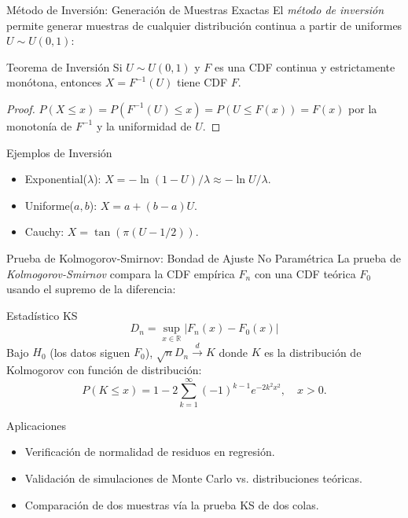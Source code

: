 \documentclass[10pt, aspectratio=169]{beamer}
\begin{document}
\begin{frame}{Método de Inversión: Generación de Muestras Exactas}
  \footnotesize
  El \emph{método de inversión} permite generar muestras de cualquier distribución continua a partir de uniformes $U \sim U(0, 1)$: \pause

  \vspace{0.1cm}
  \begin{block}{Teorema de Inversión}
    Si $U \sim U(0, 1)$ y $F$ es una CDF continua y estrictamente monótona, entonces $X = F^{-1}(U)$ tiene CDF $F$.
    \begin{proof}
      $P(X \le x) = P(F^{-1}(U) \le x) = P(U \le F(x)) = F(x)$ por la monotonía de $F^{-1}$ y la uniformidad de $U$.
    \end{proof}
  \end{block}

  \vspace{0.1cm}
  \pause
  \begin{alertblock}{Ejemplos de Inversión}
    \begin{itemize}\itemsep=0.05cm
      \item Exponential($\lambda$): $X = -\ln(1-U)/\lambda \approx -\ln U/\lambda$.
      \item Uniforme($a, b$): $X = a + (b-a)U$.
      \item Cauchy: $X = \tan(\pi(U - 1/2))$.
    \end{itemize}
  \end{alertblock}
\end{frame}

\begin{frame}{Prueba de Kolmogorov-Smirnov: Bondad de Ajuste No Paramétrica}
  \footnotesize
  La prueba de \emph{Kolmogorov-Smirnov} compara la CDF empírica $F_{n}$ con una CDF teórica $F_{0}$ usando el supremo de la diferencia: \pause

  \vspace{0.1cm}
  \begin{block}{Estadístico KS}
    $$D_{n} = \sup_{x \in \mathbb{R}} |F_{n}(x) - F_{0}(x)|$$
    Bajo $H_{0}$ (los datos siguen $F_{0}$), $\sqrt{n} D_{n} \xrightarrow{d} K$ donde $K$ es la distribución de Kolmogorov con función de distribución:
    $$P(K \le x) = 1 - 2\sum_{k=1}^{\infty}(-1)^{k-1}e^{-2k^{2}x^{2}}, \quad x > 0.$$
  \end{block}

  \vspace{0.1cm}
  \pause
  \begin{alertblock}{Aplicaciones}
    \begin{itemize}\itemsep=0.05cm
      \item Verificación de normalidad de residuos en regresión.
      \item Validación de simulaciones de Monte Carlo vs. distribuciones teóricas.
      \item Comparación de dos muestras vía la prueba KS de dos colas.
    \end{itemize}
  \end{alertblock}
\end{frame}
\end{document}
